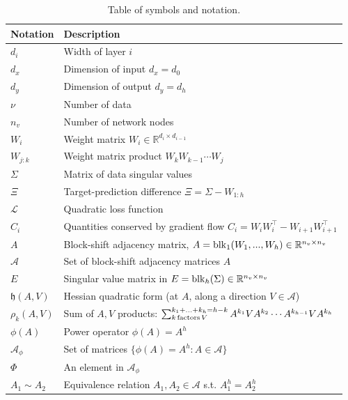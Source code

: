 \documentclass{article}
\def\block{{\rm blk}}
\newcommand{\1}{\mathds{1}}
\begin{document}
\begin{table}[h!]
    \centering
    \caption{Table of symbols and notation.}
    \bgroup
    \def\arraystretch{1.14}
    \begin{tabular}{ll}
         \hline Notation & Description \\ \hline
         $ d_i $ & Width of layer $i$ \\
         $ d_x$ & Dimension of input $d_x = d_0 $ \\
         $ d_y$ & Dimension of output $d_y = d_h $ \\
         $ \nu $ & Number of data \\
         $ n_v $ & Number of network nodes \\
         $ W_i $ & Weight matrix $ W_i \in \mathbb{R}^{d_i \times d_{i-1}}$ \\
         $W_{j:k}$ & Weight matrix product $W_k W_{k-1}\cdots W_j$ \\
         $\Sigma $ & Matrix of data singular values \\
         $\Xi$ & Target-prediction difference $\Xi = \Sigma - W_{1:h} $ \\
         $\mathcal{L}$ & Quadratic loss function \\
         $ C_i $ & Quantities conserved by gradient flow $ C_i = W_iW_i^\top - W_{i+1}W_{i+1}^\top $ \\
         $A$ & Block-shift adjacency matrix,  $A = \block_1(W_1,...,W_h) \in \mathbb{R}^{n_v \times n_v}$ \\
         $\mathcal{A}$ & Set of block-shift adjacency matrices $A$ \\
         $ E $ & Singular value matrix in $ E = \block_h(\Sigma) \in \mathbb{R}^{n_v \times n_v}$ \\
         $\mathfrak{h}(A,V)$ & Hessian quadratic form (at $A$, along a direction $V\in\mathcal{A}$) \\
         $\rho_k(A,V)$ & Sum of $A,V$ products: $\sum_{k {\rm \, factors \,} V}^{k_1+...+k_h = h-k} A^{k_1}VA^{k_2}\cdots A^{k_{h-1}} V A^{k_h}$ \\
         $\phi(A)$ & Power operator $\phi(A) = A^h $ \\
         $ \mathcal{A}_{\phi} $ & Set of matrices $\{\phi(A) = A^h : A\in \mathcal{A} \}$ \\
         $\Phi$ & An element in $\mathcal{A}_{\phi}$ \\
         $A_1 \sim A_2$ & Equivalence relation $A_1,A_2\in \mathcal{A}$ s.t. $ A_1^h = A_2^h $\\

\end{tabular}
\end{table}
\end{document}
